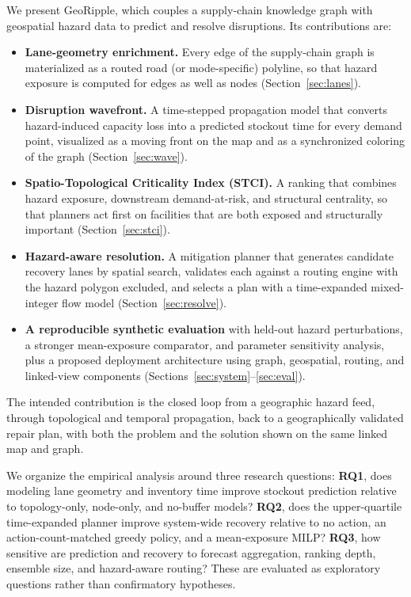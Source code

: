 \documentclass[conference]{IEEEtran}
\begin{document}
We present GeoRipple, which couples a supply-chain knowledge graph with
geospatial hazard data to predict and resolve disruptions. Its
contributions are:
\begin{itemize}
  \item \textbf{Lane-geometry enrichment.} Every edge of the supply-chain
  graph is materialized as a routed road (or mode-specific) polyline, so
  that hazard exposure is computed for edges as well as nodes
  (Section~\ref{sec:lanes}).
  \item \textbf{Disruption wavefront.} A time-stepped propagation model
  that converts hazard-induced capacity loss into a predicted
  stockout time for every demand point, visualized as a moving front on the map
  and as a synchronized coloring of the graph (Section~\ref{sec:wave}).
  \item \textbf{Spatio-Topological Criticality Index (STCI).} A ranking
  that combines hazard exposure, downstream demand-at-risk, and
  structural centrality, so that planners act first on facilities that
  are both exposed and structurally important (Section~\ref{sec:stci}).
  \item \textbf{Hazard-aware resolution.} A mitigation planner that
  generates candidate recovery lanes by spatial search, validates each
  against a routing engine with the hazard polygon excluded, and selects
  a plan with a time-expanded mixed-integer flow model
  (Section~\ref{sec:resolve}).
  \item \textbf{A reproducible synthetic evaluation} with held-out hazard
  perturbations, a stronger mean-exposure comparator, and parameter
  sensitivity analysis, plus a proposed
  deployment architecture using graph, geospatial, routing, and linked-view
  components
  (Sections~\ref{sec:system}--\ref{sec:eval}).
\end{itemize}

The intended contribution is the closed loop from a geographic hazard feed,
through topological and temporal propagation, back to a
geographically validated repair plan, with both the problem and the
solution shown on the same linked map and graph.

We organize the empirical analysis around three research questions:
\textbf{RQ1}, does modeling lane geometry and inventory time improve
stockout prediction relative to topology-only, node-only, and no-buffer
models? \textbf{RQ2}, does the upper-quartile time-expanded planner improve
system-wide recovery relative to no action, an action-count-matched greedy
policy, and a mean-exposure MILP? \textbf{RQ3}, how sensitive are prediction
and recovery to forecast aggregation, ranking depth, ensemble size, and
hazard-aware routing? These are evaluated as exploratory questions rather
than confirmatory hypotheses.
\end{document}
